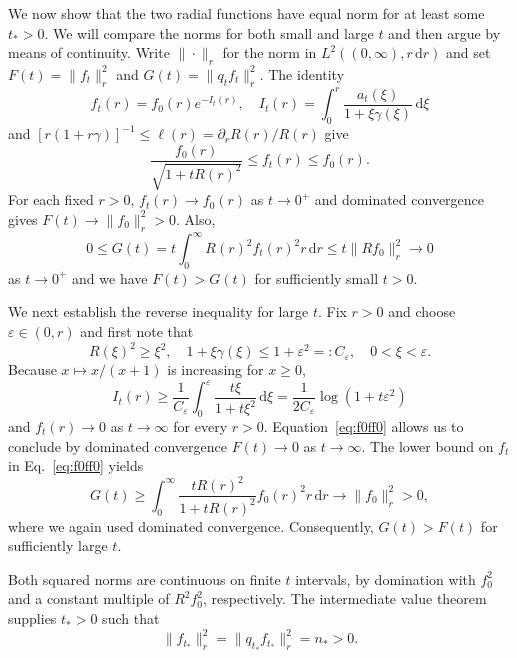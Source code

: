 \documentclass[11pt,a4paper]{article}
\theoremstyle{remark}
\theoremstyle{plain}
\begin{document}
We now show that the two radial functions have equal norm for 
at least some $t_*>0$. We will compare the norms for both 
small and large $t$ and then argue by means of continuity. 
Write $\|\cdot\|_r$ for the norm in $L^2((0,\infty),r\,\mathrm{d}r)$ and 
set $F(t) = \|f_t\|_r^2$ and $G(t) = \|q_t f_t\|_r^2$.
The identity
\begin{equation}
 f_t(r)=f_0(r) e^{-I_t(r)}, \quad 
 I_t(r) = \int_0^r
       \frac{a_t(\xi)}{1+\xi \gamma(\xi)}\,\mathrm{d}\xi
 \label{eq:ft-comparison}
\end{equation}
and $[r(1+r\gamma)]^{-1}\le\ell(r) = \partial_r R(r)/R(r)$ give
\begin{equation}\label{eq:f0ff0}
 \frac{f_0(r)}{\sqrt{1+tR(r)^2}}\le f_t(r)\le f_0(r).
\end{equation}
For each fixed $r>0$, $f_t(r) \to f_0(r)$ as $t\to 0^+$ and
dominated convergence gives $F(t)\to  \|f_0\|_r^2>0$.
Also, 
\begin{equation*}
      0 \leq G(t) = t \int_0^\infty R(r)^2 f_t(r)^2 r \, \mathrm{d}r
      \leq t \|R f_0\|_r^2 \to 0
\end{equation*}
as $t\to 0^+$ and we have $F(t) > G(t)$ for
sufficiently small $t>0$. 

We next establish the reverse inequality for large $t$. 
Fix $r>0$ and choose $\varepsilon\in (0,r)$ and 
first note that 
\begin{equation*}
      R(\xi)^2 \geq \xi^2, \quad 1 + \xi \gamma(\xi) 
      \leq 1 + \varepsilon^2 =: C_\varepsilon,
      \quad 0<\xi < \varepsilon.
\end{equation*} 
Because $x\mapsto x/(x+1)$ is increasing for $x\geq 0$,
\begin{equation*}
I_t(r) \geq 
\frac{1}{C_\varepsilon} \int_0^\varepsilon \frac{t\xi}{1+t\xi^2} \,\mathrm{d}\xi
=  \frac{1}{2C_\varepsilon}\log(1+t\varepsilon^2)
\end{equation*} 
and $f_t(r) \to 0$ as $t\to\infty$ for every $r>0$. 
Equation~\eqref{eq:f0ff0} allows us to conclude by 
dominated convergence $F(t) \to 0$ as $t\to \infty$. 
The lower bound on $f_t$ in Eq.~\eqref{eq:f0ff0} yields
\begin{equation*}
 G(t)\ge\int_0^\infty
 \frac{tR(r)^2}{1+tR(r)^2}f_0(r)^2r\,\mathrm{d}r
 \longrightarrow\|f_0\|_r^2>0,
\end{equation*}
where we again used dominated convergence. 
Consequently, $G(t) >F(t)$ for sufficiently large $t$. 

Both squared norms are continuous on finite $t$ intervals, by
domination with $f_0^2$ and a 
constant multiple of $R^2f_0^2$, respectively.
The intermediate value theorem supplies $t_*>0$ such that
\begin{equation}
 \|f_{t_*}\|_r^2=\|q_{t_*}f_{t_*}\|_r^2=n_*>0.
 \label{eq:equal-norms}
\end{equation}
\end{document}
